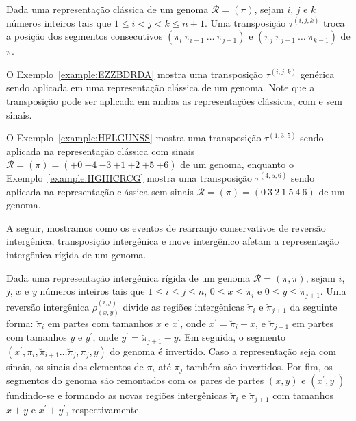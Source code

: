 



\begin{definition}
Dada uma representação clássica de um genoma $\mathcal{R} = (\pi)$, sejam $i$, $j$ e $k$ números inteiros tais que $1 \le i < j < k \le n + 1$. Uma transposição $\tau^{(i,j,k)}$ troca a posição dos segmentos consecutivos $(\pi_i~\pi_{i+1}~\dots~\pi_{j-1})$ e $(\pi_j~\pi_{j+1}~\dots~\pi_{k-1})$ de $\pi$.
\end{definition}

O Exemplo~\ref{example:EZZBDRDA} mostra uma transposição $\tau^{(i,j,k)}$ genérica sendo aplicada em uma representação clássica de um genoma. Note que a transposição pode ser aplicada em ambas as representações clássicas, com e sem sinais.



O Exemplo~\ref{example:HFLGUNSS} mostra uma transposição $\tau^{(1,3,5)}$ sendo aplicada na representação clássica com sinais $\mathcal{R} = (\pi) = ({+0}~{-4}~{-3}~{+1}~{+2}~{+5}~{+6})$ de um genoma, enquanto o Exemplo~\ref{example:HGHICRCG} mostra uma transposição $\tau^{(4,5,6)}$ sendo aplicada na representação clássica sem sinais $\mathcal{R} = (\pi) = ({0}~{3}~{2}~{1}~{5}~{4}~{6})$ de um genoma.





A seguir, mostramos como os eventos de rearranjo conservativos de reversão intergênica, transposição intergênica e move intergênico afetam a representação intergênica rígida de um genoma. 

\begin{definition}
Dada uma representação intergênica rígida de um genoma $\mathcal{R} = (\pi,\breve\pi)$, sejam $i$, $j$, $x$ e $y$ números inteiros tais que $1 \le i \le j \le n$, $0 \le x \le \breve\pi_i$ e $0 \le y \le \breve\pi_{j+1}$. Uma reversão intergênica $\rho^{(i, j)}_{(x, y)}$ divide as regiões intergênicas $\breve\pi_i$ e $\breve\pi_{j+1}$ da seguinte forma: $\breve\pi_i$ em partes com tamanhos $x$ e $x^{\prime}$, onde $x^{\prime}=\breve\pi_i-x$, e $\breve\pi_{j+1}$ em partes com tamanhos $y$ e $y^{\prime}$, onde $y^{\prime}=\breve\pi_{j+1}-y$. Em seguida, o segmento $(x^{\prime},\pi_i,\breve\pi_{i+1}\dots\breve\pi_j,\pi_j,y)$ do genoma é invertido. Caso a representação seja com sinais, os sinais dos elementos de $\pi_i$ até $\pi_{j}$ também são invertidos. Por fim, os segmentos do genoma são remontados com os pares de partes $(x,y)$ e $(x^{\prime},y^{\prime})$ fundindo-se e formando as novas regiões intergênicas $\breve\pi_i$ e $\breve\pi_{j+1}$ com tamanhos $x + y$ e $x^{\prime}+y^{\prime}$, respectivamente.
\end{definition}

